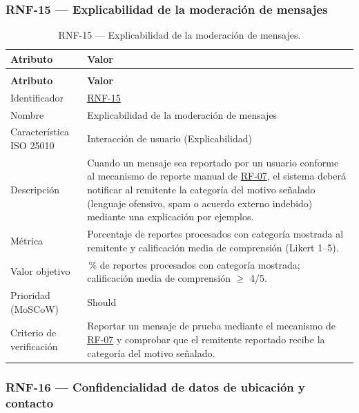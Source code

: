 \documentclass[journal,onecolumn]{IEEEtran}
\makeatletter
\newenvironment{atributos}[2]{%
	\small
	\begin{longtable}{@{}>{\raggedright\arraybackslash}p{4.2cm} >{\raggedright\arraybackslash}p{11.2cm}@{}}
		\caption{#2}\label{tab:#1}\\
		\toprule
		\textbf{Atributo} & \textbf{Valor} \\
		\midrule
		\endfirsthead
		\multicolumn{2}{@{}l}{\small\itshape (continuación)}\\
		\toprule
		\textbf{Atributo} & \textbf{Valor} \\
		\midrule
		\endhead
		\bottomrule
		\endlastfoot
	}{%
	\end{longtable}
	\normalsize
}
\makeatother
\begin{document}
	\subsubsection{RNF-15 --- Explicabilidad de la moderación de mensajes}
	
	\begin{atributos}{RNF-15}{RNF-15 --- Explicabilidad de la moderación de mensajes.}
		Identificador & \hyperref[tab:RNF-15]{RNF-15} \\
		Nombre & Explicabilidad de la moderación de mensajes \\
		Característica ISO 25010 & Interacción de usuario (Explicabilidad) \\
		Descripción & Cuando un mensaje sea reportado por un usuario conforme al mecanismo de reporte manual de \hyperref[tab:RF-07]{RF-07}, el sistema deberá notificar al remitente la categoría del motivo señalado (lenguaje ofensivo, spam o acuerdo externo indebido) mediante una explicación por ejemplos. \\
		Métrica & Porcentaje de reportes procesados con categoría mostrada al remitente y calificación media de comprensión (Likert 1--5). \\
		Valor objetivo & 100\,\% de reportes procesados con categoría mostrada; calificación media de comprensión $\geq$ 4/5. \\
		Prioridad (MoSCoW) & Should \\
		Criterio de verificación & Reportar un mensaje de prueba mediante el mecanismo de \hyperref[tab:RF-07]{RF-07} y comprobar que el remitente reportado recibe la categoría del motivo señalado. \\
	\end{atributos}
	
	
	\subsubsection{RNF-16 --- Confidencialidad de datos de ubicación y contacto}
	
\end{document}
